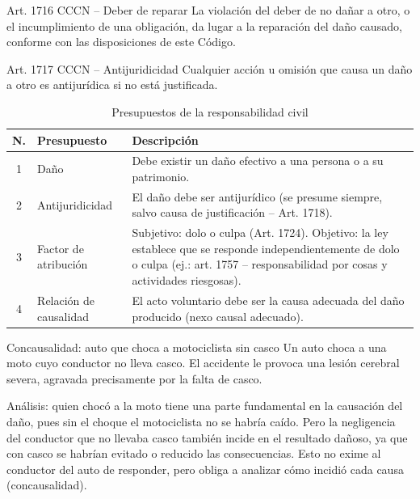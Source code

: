 \documentclass[12pt,oneside]{book}
\begin{document}
\begin{definition}{Art. 1716 CCCN -- Deber de reparar}
La violación del deber de no dañar a otro, o el incumplimiento de una obligación, da lugar a la reparación del daño causado, conforme con las disposiciones de este Código.
\end{definition}

\begin{definition}{Art. 1717 CCCN -- Antijuridicidad}
Cualquier acción u omisión que causa un daño a otro es antijurídica si no está justificada.
\end{definition}

\begin{table}[H]
\centering
\caption{Presupuestos de la responsabilidad civil}
\begin{tabularx}{\textwidth}{c l X}
\toprule
\textbf{N.\textdegree{}} & \textbf{Presupuesto} & \textbf{Descripción} \\
\midrule
1 & Daño & Debe existir un daño efectivo a una persona o a su patrimonio. \\
2 & Antijuridicidad & El daño debe ser antijurídico (se presume siempre, salvo causa de justificación -- Art. 1718). \\
3 & Factor de atribución & Subjetivo: dolo o culpa (Art. 1724). Objetivo: la ley establece que se responde independientemente de dolo o culpa (ej.: art. 1757 -- responsabilidad por cosas y actividades riesgosas). \\
4 & Relación de causalidad & El acto voluntario debe ser la causa adecuada del daño producido (nexo causal adecuado). \\
\bottomrule
\end{tabularx}
\end{table}

\begin{example}{Concausalidad: auto que choca a motociclista sin casco}
Un auto choca a una moto cuyo conductor no lleva casco. El accidente le provoca una lesión cerebral severa, agravada precisamente por la falta de casco.

Análisis: quien chocó a la moto tiene una parte fundamental en la causación del daño, pues sin el choque el motociclista no se habría caído. Pero la negligencia del conductor que no llevaba casco también incide en el resultado dañoso, ya que con casco se habrían evitado o reducido las consecuencias. Esto no exime al conductor del auto de responder, pero obliga a analizar cómo incidió cada causa (concausalidad).
\end{example}
\end{document}
